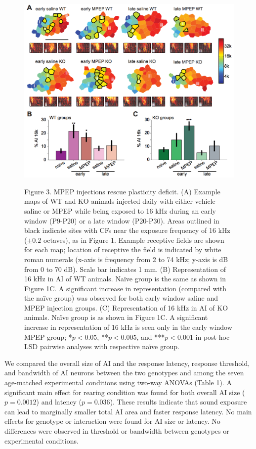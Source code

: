\begin{figure}[p]
	\centering
		\includegraphics[width=6in]{images/C2F3}
	\begin{changemargin}{1in}{1in}
	\footnotesize{Figure 3. MPEP injections rescue plasticity deficit. (A) Example maps of WT and KO animals injected daily with either vehicle saline or MPEP while being exposed to 16 kHz during an early window (P9-P20) or a late window (P20-P30). Areas outlined in black indicate sites with CFs near the exposure frequency of 16 kHz ($\pm0.2$ octaves), as in Figure 1. Example receptive fields are shown for each map; location of receptive the field is indicated by white roman numerals (x-axis is frequency from 2 to 74 kHz; y-axis is dB from 0 to 70 dB). Scale bar indicates 1 mm. (B) Representation of 16 kHz in AI of WT animals. Na\"ive group is the same as shown in Figure 1C. A significant increase in representation (compared with the na\"ive group) was observed for both early window saline and MPEP injection groups. (C) Representation of 16 kHz in AI of KO animals. Na\"ive group is as shown in Figure 1C. A significant increase in representation of 16 kHz is seen only in the early window MPEP group; *$p<0.05$, **$p<0.005$, and ***$p<0.001$ in post-hoc LSD pairwise analyses with respective na\"ive group.}
	\end{changemargin}
\end{figure}

We compared the overall size of AI and the response latency, response threshold, and bandwidth of AI neurons between the two genotypes and among the seven age-matched experimental conditions using two-way ANOVAs (Table 1). A significant main effect for rearing condition was found for both overall AI size ($p=0.0012$) and latency ($p=0.036$). These results indicate that sound exposure can lead to marginally smaller total AI area and faster response latency. No main effects for genotype or interaction were found for AI size or latency. No differences were observed in threshold or bandwidth between genotypes or experimental conditions.


